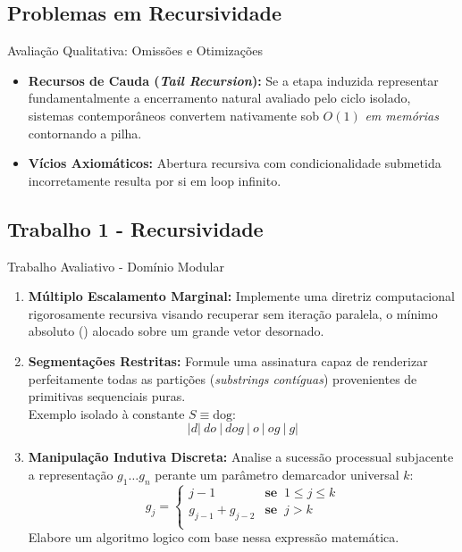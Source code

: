 \documentclass{beamer}
\begin{document}
\subsection{Problemas em Recursividade}
\begin{frame}{Avaliação Qualitativa: Omissões e Otimizações}


\begin{itemize}
 \item \textbf{Recursos de Cauda (\textit{Tail Recursion}):} Se a etapa induzida representar fundamentalmente a encerramento natural avaliado pelo ciclo isolado, sistemas contemporâneos convertem nativamente sob $O(1)$ \textit{em memórias} contornando a pilha.
 \item \textbf{Vícios Axiomáticos:} Abertura recursiva com condicionalidade submetida incorretamente resulta por si em loop infinito.
\end{itemize}
\end{frame}


\subsection{Trabalho 1 - Recursividade}
\begin{frame}[allowframebreaks]{Trabalho Avaliativo - Domínio Modular}
\begin{enumerate}
 \item \textbf{Múltiplo Escalamento Marginal:} Implemente uma diretriz computacional rigorosamente recursiva visando recuperar sem iteração paralela, o mínimo absoluto () alocado sobre um grande vetor desornado.
 
 \item \textbf{Segmentações Restritas:} Formule uma assinatura capaz de renderizar perfeitamente todas as partições (\textit{substrings contíguas}) provenientes de primitivas sequenciais puras. \\
 Exemplo isolado à constante $S \equiv \text{dog}$:
 $$| d | \ do \ | \ dog \ | \ o \ | \ og \ | \ g |$$
 
 \item \textbf{Manipulação Indutiva Discreta:} Analise a sucessão processual subjacente a representação $g_1 \dots g_n$ perante um parâmetro demarcador universal $k$:
  \begin{equation}
  g_j =
    \begin{cases}
      j-1 & \textbf{se } \: 1 \leq j \leq k   \\
      g_{j-1}+g_{j-2} & \textbf{se } \: j > k  \\
    \end{cases}       
  \end{equation}
 Elabore um algoritmo logico com base nessa expressão matemática.
\end{enumerate}
\end{frame}
\end{document}
